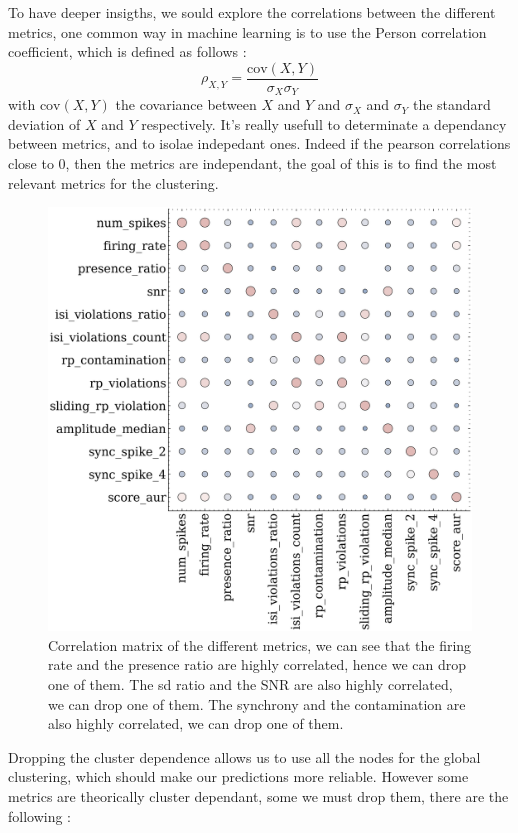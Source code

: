 \documentclass[11pt,a4paper]{report}
\begin{document}
\begin{multicols}{2}
\begin{itemize}
    \end{itemize}
    To have deeper insigths, we sould explore the correlations between the different metrics, one common way in machine learning is to use the Person correlation coefficient, which is defined as follows :
    $$\rho_{X,Y}  = \frac{\text{cov}(X,Y)}{\sigma_X\sigma_Y}$$ with $\text{cov}(X,Y)$ the covariance between $X$ and $Y$ and $\sigma_X$ and $\sigma_Y$ the standard deviation of $X$ and $Y$ respectively.
    It's really usefull to determinate a dependancy between metrics, and to isolae indepedant ones. Indeed if the pearson correlations close to 0, then the metrics are independant, the goal of this is to find the most relevant metrics for the clustering.

    \begin{figure}[H]
        \centering
        \includegraphics[width=\linewidth]{./figure/correlation.png}
        \caption{Correlation matrix of the different metrics, we can see that the firing rate and the presence ratio are highly correlated, hence we can drop one of them. The sd ratio and the SNR are also highly correlated, we can drop one of them. The synchrony and the contamination are also highly correlated, we can drop one of them.}
        \label{}
    \end{figure}
    Dropping the cluster dependence allows us to use all the nodes for the global clustering, which should make our predictions more reliable. However some metrics are theorically cluster dependant, some we must drop them, there are the following :

\end{multicols}
\end{document}
